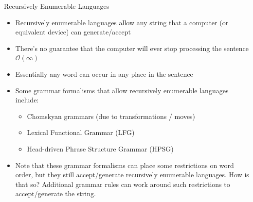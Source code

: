 \documentclass{beamer}
\newcommand{\detail}[1]{{\color{lightgrey}\small{}#1}}
\begin{document}
\begin{frame}{Recursively Enumerable Languages}
\begin{block}{}
\begin{itemize}
	\item Recursively enumerable languages allow any string that a computer (or equivalent device) can generate/accept
	\item There's no guarantee that the computer will ever stop processing the sentence \detail{$\mathcal{O}(\infty)$}
	\item Essentially any word can occur in any place in the sentence
	\pause
	\item Some grammar formalisms that allow recursively enumerable languages include:
	\begin{itemize}
		\item Chomskyan grammars (due to transformations / moves)
		\item Lexical Functional Grammar (LFG)
		\item Head-driven Phrase Structure Grammar (HPSG)
	\end{itemize}
	\pause
	\item Note that these grammar formalisms can place some restrictions on word order, but they still accept/generate recursively enumerable languages. \pause How is that so? \pause Additional grammar rules can work around such restrictions to accept/generate the string.
\end{itemize}
\end{block}
\end{frame}



\end{document}
